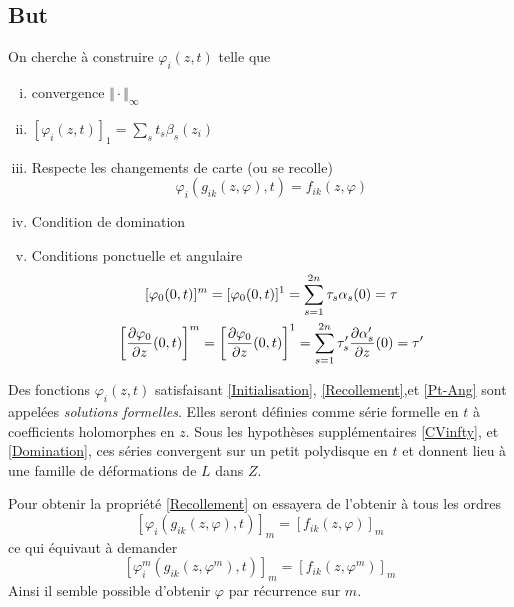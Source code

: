 \documentclass[a4paper,10pt,draft,makeidx,twocolumn]{amsart}
\begin{document}
\subsection{But}
On cherche à construire $\varphi_i(z,t)$ telle que
\begin{enumerate}[(i)]
\item convergence $\Vert \cdot \Vert_\infty$ \label{CVinfty}
\item $[\varphi_i(z,t)]_1 = \sum_s t_s \beta_s(z_i)$\label{Initialisation}
\item Respecte les changements de carte (ou se recolle)\label{Recollement}
\begin{equation}
\varphi_i(g_{ik}(z,\varphi),t) = f_{ik}(z, \varphi)
\end{equation}
\item Condition de domination\label{Domination}
\item Conditions ponctuelle et angulaire\label{Pt-Ang}
\begin{subequations}\begin{gather}
	[\varphi_0(0,t)]^m = [\varphi_0(0,t)]^1  = \sum_{s=1}^{2n} \tau_s \alpha_s(0) = \tau\label{E:Pt}\\
	\left[\dfrac{\partial{\varphi_0}}{\partial{z}}(0,t)\right]^m = \left[\dfrac{\partial{\varphi_0}}{\partial{z}}(0,t)\right]^1  = \sum_{s=1}^{2n} \tau'_s \dfrac{\partial{\alpha'_s}}{\partial{z}}(0) = \tau'\label{E:Ang}
  \end{gather}\end{subequations}
\end{enumerate}

Des fonctions $\varphi_i(z,t)$ satisfaisant \eqref{Initialisation}, \eqref{Recollement},et \eqref{Pt-Ang} sont appelées \emph{solutions formelles}. Elles seront définies comme série formelle en $t$ à coefficients holomorphes en $z$. Sous les hypothèses supplémentaires \eqref{CVinfty}, et \eqref{Domination}, ces séries convergent sur un petit polydisque en $t$ et donnent lieu à une famille de déformations de $L$ dans $Z$.

Pour obtenir la propriété \eqref{Recollement} on essayera de l'obtenir à tous les ordres
\begin{equation}\label{recollement_m}
\left[\varphi_i(g_{ik}(z,\varphi),t)\right]_m = \left[f_{ik}(z, \varphi)\right]_m
\end{equation}
ce qui équivaut à demander
\begin{equation}\label{Recollement_m}
\left[\varphi^m_i(g_{ik}(z,\varphi^m),t)\right]_m = \left[f_{ik}(z, \varphi^m)\right]_m
\end{equation}
Ainsi il semble possible d'obtenir $\varphi$ par récurrence sur $m$.
\end{document}
